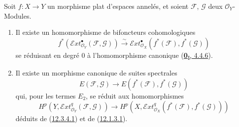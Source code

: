 \begin{proposition}[12.3.4]
\label{0.12.3.4-fr}
Soit $f:X\to Y$ un morphisme \textup{plat} d'espaces annelés, et soient
$\mathcal F$, $\mathcal G$ deux $\mathcal O_Y$-Modules.
\begin{enumerate}
\item[{\rm(i)}] Il existe un homomorphisme de bifoncteurs
cohomologiques
\[
\label{0.12.3.4.1-fr}
\tag{12.3.4.1}
f^*(\mathcal{E}xt_{\mathcal O_Y}^{\bullet}(\mathcal F,\mathcal G))
\xrightarrow{\sim}
\mathcal{E}xt_{\mathcal O_X}^{\bullet}(f^*(\mathcal F),f^*(\mathcal G))
\]
se réduisant en degré $0$ à l'homomorphisme canonique
(\hyperref[0.4.4.6-fr]{\textbf{0}\textsubscript{I}, 4.4.6}).

\item[{\rm(ii)}] Il existe un morphisme canonique de suites spectrales
\[
\label{0.12.3.4.2-fr}
\tag{12.3.4.2}
E(\mathcal F,\mathcal G)\longrightarrow
E(f^*(\mathcal F),f^*(\mathcal G))
\]
qui, pour les termes $E_2$, se réduit aux homomorphismes
\[
\label{0.12.3.4.3-fr}
\tag{12.3.4.3}
H^p(Y,\mathcal{E}xt_{\mathcal O_Y}^q(\mathcal F,\mathcal G))
\longrightarrow
H^p(X,\mathcal{E}xt_{\mathcal O_X}^q(f^*(\mathcal F),f^*(\mathcal G)))
\]
déduits de (\hyperref[0.12.3.4.1-fr]{12.3.4.1}) et de
(\hyperref[0.12.1.3.1-fr]{12.1.3.1}).
\end{enumerate}
\end{proposition}

